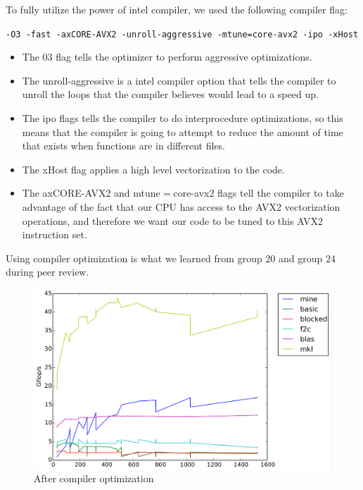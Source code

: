 \documentclass[11pt]{article}
\begin{document}
        \vspace{0.5cm}
        
        To fully utilize the power of intel compiler, we used the following compiler flag:
        \begin{center}
        \texttt{-O3 -fast -axCORE-AVX2 -unroll-aggressive -mtune=core-avx2 -ipo -xHost} 
        \end{center}
        
        \begin{itemize}
            \item The 03 flag tells the optimizer to perform aggressive optimizations.
            \item The unroll-aggressive is a intel compiler option that tells the compiler to unroll the loops that the compiler believes would lead to a speed up. 
            \item The ipo flags tells the compiler to do interprocedure optimizations, so this means that the compiler is going to attempt to reduce the amount of time that exists when functions are in different files.
            \item The xHost flag applies a high level vectorization to the code.
            \item The axCORE-AVX2  and mtune$=$core-avx2 flags tell the compiler to take advantage of the fact that our CPU has access to the AVX2 vectorization operations, and therefore we want our code to be tuned to this AVX2 instruction set. 
        \end{itemize}
        
        Using compiler optimization is what we learned from group 20 and group 24 during peer review.
        
        \vspace{1cm}
        
        \begin{figure}[H]
                \centering
                \includegraphics[width=4.5in]{timing_vector_32_64_cc_cp_align.png}
                \caption{After compiler optimization}
        \end{figure}
        
\end{document}
